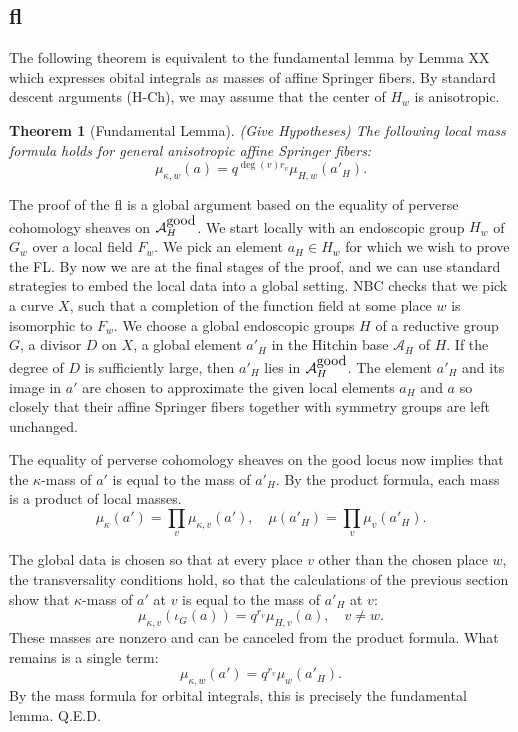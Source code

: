 \documentclass[brochure,english,12pt]{bourbaki}
\newtheorem{theorem}[equation]{Theorem}
\def\A{{\mathcal A}}
\begin{document}
\subsection{fl}

The following theorem is equivalent to the fundamental lemma by Lemma XX which
expresses obital integrals as masses of affine Springer fibers.
By
standard descent arguments (H-Ch), we may assume that the center of
$H_w$ is anisotropic. 


\begin{theorem}[Fundamental Lemma]  (Give Hypotheses)
The following local mass formula holds for general anisotropic affine Springer fibers:
\[
\mu_{\kappa,w}(a) = q^{\deg(v) r_v}\mu_{H,w}(a'_H).
\]
\end{theorem}

The proof of the fl is a global argument based on the equality of
perverse cohomology sheaves on $\A_H^{\hbox{good}}$.  We start locally
with an endoscopic group $H_w$ of $G_w$ over a local field $F_w$.  We
pick an element $a_H\in H_w$ for which we wish to prove the FL.  By
now we are at the final stages of the proof, and we can use standard
strategies to embed the local data into a global setting.  NBC checks
that we pick a curve $X$, such that a completion of the function field
at some place $w$ is isomorphic to $F_w$.  We choose a global
endoscopic groups $H$ of a reductive group $G$, a divisor $D$ on $X$,
a global element $a'_H$ in the Hitchin base $\A_H$ of $H$.  If the
degree of $D$ is sufficiently large, then $a'_H$ lies in
$\A_H^{\hbox{good}}$.  The element $a'_H$ and its image in $a'$ are
chosen to approximate the given local elements $a_H$ and $a$ so
closely that their affine Springer fibers together with symmetry
groups are left unchanged.

The equality of perverse cohomology sheaves on the good locus now implies
that the $\kappa$-mass of $a'$ is equal to the mass of $a'_H$.  By the product formula,
each mass is a product of local masses.  
\[
\mu_\kappa(a') = \prod_v \mu_{\kappa,v}(a'),\quad
\mu(a'_H) = \prod_v\mu_{v}(a'_H).
\]

The global data is chosen so that at every
place $v$ other than the chosen place $w$, the transversality conditions hold, so that
the calculations of the previous section show that $\kappa$-mass of $a'$ at $v$ is
equal to the mass of $a'_H$ at $v$:
\[
\mu_{\kappa,v}(\iota_G(a)) = q^{r_v}\mu_{H,v}(a),\quad v\ne w.
\]  
These masses are nonzero and  can be canceled from
the product formula.  What remains is a single term:
\[
\mu_{\kappa,w}(a') = q^{r_v}\mu_{w}(a'_H).
\]
By the mass formula for orbital integrals, this is precisely the fundamental lemma.
Q.E.D.
\end{document}
